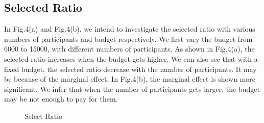\documentclass[10pt,journal,letterpaper,compsoc]{IEEEtran}
\begin{document}
\subsection{Selected Ratio}
In Fig.4(a) and Fig.4(b), we intend to investigate the selected ratio with various numbers of participants and budget respectively. We first vary the budget from 6000 to 15000, with different numbers of participants. As shown in Fig.4(a), the selected ratio increases when the budget gets higher. We can also see that with a fixed budget, the selected ratio decrease with the number of participants. It may be because of the marginal effect. In Fig.4(b), the marginal effect is shown more significant. We infer that when the number of participants gets larger, the budget may be not enough to pay for them. 
\begin{figure}[!t]
  \centering
  \vspace{-0.2cm}
  \caption{Select Ratio}
  \vspace{-0.2cm}
\end{figure}
\end{document}
